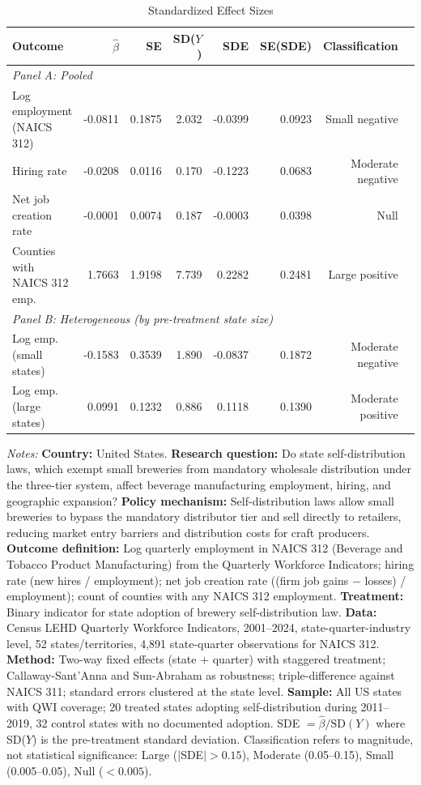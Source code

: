 \begin{table}[t]
\centering
\caption{Standardized Effect Sizes}
\label{tab:sde}
\begin{threeparttable}\footnotesize
\begin{tabular}{lrrrrrrr}
\toprule
Outcome & $\hat{\beta}$ & SE & SD($Y$) & SDE & SE(SDE) & Classification \\
\midrule
\multicolumn{7}{l}{\textit{Panel A: Pooled}} \\[4pt]
Log employment (NAICS 312) & -0.0811 & 0.1875 & 2.032 & -0.0399 & 0.0923 & Small negative \\
Hiring rate & -0.0208 & 0.0116 & 0.170 & -0.1223 & 0.0683 & Moderate negative \\
Net job creation rate & -0.0001 & 0.0074 & 0.187 & -0.0003 & 0.0398 & Null \\
Counties with NAICS 312 emp. & 1.7663 & 1.9198 & 7.739 & 0.2282 & 0.2481 & Large positive \\
[6pt]
\multicolumn{7}{l}{\textit{Panel B: Heterogeneous (by pre-treatment state size)}} \\[4pt]
Log emp. (small states) & -0.1583 & 0.3539 & 1.890 & -0.0837 & 0.1872 & Moderate negative \\
Log emp. (large states) & 0.0991 & 0.1232 & 0.886 & 0.1118 & 0.1390 & Moderate positive \\
\bottomrule
\end{tabular}
\begin{tablenotes}[flushleft]\small
\item \textit{Notes:} \textbf{Country:} United States. \textbf{Research question:} Do state self-distribution laws, which exempt small breweries from mandatory wholesale distribution under the three-tier system, affect beverage manufacturing employment, hiring, and geographic expansion? \textbf{Policy mechanism:} Self-distribution laws allow small breweries to bypass the mandatory distributor tier and sell directly to retailers, reducing market entry barriers and distribution costs for craft producers. \textbf{Outcome definition:} Log quarterly employment in NAICS 312 (Beverage and Tobacco Product Manufacturing) from the Quarterly Workforce Indicators; hiring rate (new hires / employment); net job creation rate ((firm job gains $-$ losses) / employment); count of counties with any NAICS 312 employment. \textbf{Treatment:} Binary indicator for state adoption of brewery self-distribution law. \textbf{Data:} Census LEHD Quarterly Workforce Indicators, 2001--2024, state-quarter-industry level, 52 states/territories, 4,891 state-quarter observations for NAICS 312. \textbf{Method:} Two-way fixed effects (state + quarter) with staggered treatment; Callaway-Sant'Anna and Sun-Abraham as robustness; triple-difference against NAICS 311; standard errors clustered at the state level. \textbf{Sample:} All US states with QWI coverage; 20 treated states adopting self-distribution during 2011--2019, 32 control states with no documented adoption. SDE $= \hat{\beta} / \text{SD}(Y)$ where SD($Y$) is the pre-treatment standard deviation. Classification refers to magnitude, not statistical significance: Large ($|$SDE$| > 0.15$), Moderate (0.05--0.15), Small (0.005--0.05), Null ($< 0.005$).

\end{tablenotes}
\end{threeparttable}
\end{table}
